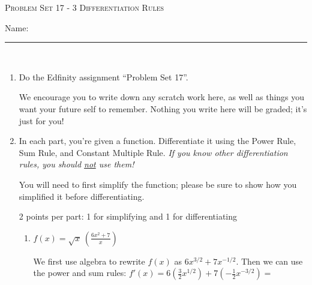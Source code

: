 \documentclass{article}
\newcommand{\doedfinity}[2][\newpage]{
  \begin{problem}[#1]
    Do the Edfinity assignment ``Problem Set #2''.

    We encourage you to write down any scratch work here, as well as
    things you want your future self to remember. Nothing you write
    here will be graded; it's just for you!
  \end{problem}
}
\begin{document}
\begin{center}
  \large\textsc{Problem Set 17 - 3 Differentiation Rules}\vspace{.5in}\\
  \begin{problemonly}
   \large Name: \rule{5cm}{0.15mm}\\
   \end{problemonly}
\end{center}

\begin{enumerate}
\item  {}

  \doedfinity{17}

\item  

  In each part, you're given a function. Differentiate it using the Power Rule, Sum Rule, and Constant Multiple Rule. \emph{If you know other differentiation rules, you should \uline{not} use them!}

  You will need to first simplify the function; please be sure to show how you simplified it before differentiating.

  \begin{grading}
    2 points per part: 1 for simplifying and 1 for differentiating 
  \end{grading}

  \begin{enumerate}

  \item
    \begin{problem}[\vfill]
      $f(x) =\displaystyle \sqrt x \, \left( \frac{6x^2 + 7}{x}\right)
      $
    \end{problem}

    \begin{solution}
      We first use algebra to rewrite $f(x)$ as $6x^{3/2} + 7x^{-1/2}$. 
      Then we can use the power and sum rules: $f'(x) = 6(\frac{3}{2}x^{1/2}) + 
      7(-\frac{1}{2}x^{-3/2}) =$ 
    \end{solution}


\end{enumerate}
\end{enumerate}
\end{document}
